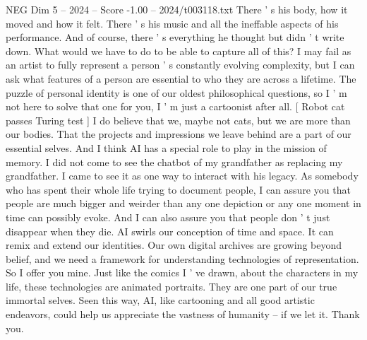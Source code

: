 \begin{textsample}{NEG Dim 5 – 2024 – Score -1.00 – 2024/t003118.txt}
There ' s his body, how it moved and how it felt.
There ' s his music and all the ineffable aspects of his performance.
And of course, there ' s everything he thought but didn ' t write down.
What would we have to do to be able to capture all of this?
I may fail as an artist to fully represent a person ' s constantly evolving complexity, but I can ask what features of a person are essential to who they are across a lifetime.
The puzzle of personal identity is one of our oldest philosophical questions, so I ' m not here to solve that one for you, I ' m just a cartoonist after all. [ Robot cat passes Turing test ] I do believe that we, maybe not cats, but we are more than our bodies.
That the projects and impressions we leave behind are a part of our essential selves.
And I think AI has a special role to play in the mission of memory.
I did not come to see the chatbot of my grandfather as replacing my grandfather.
I came to see it as one way to interact with his legacy.
As somebody who has spent their whole life trying to document people, I can assure you that people are much bigger and weirder than any one depiction or any one moment in time can possibly evoke.
And I can also assure you that people don ' t just disappear when they die.
AI swirls our conception of time and space.
It can remix and extend our identities.
Our own digital archives are growing beyond belief, and we need a framework for understanding technologies of representation.
So I offer you mine.
Just like the comics I ' ve drawn, about the characters in my life, these technologies are animated portraits.
They are one part of our true immortal selves.
Seen this way, AI, like cartooning and all good artistic endeavors, could help us appreciate the vastness of humanity -- if we let it.
Thank you.

\end{textsample}

